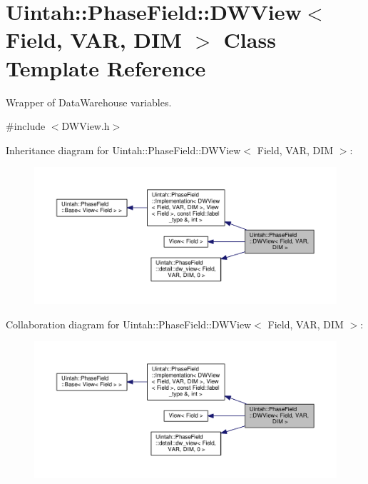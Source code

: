 \hypertarget{classUintah_1_1PhaseField_1_1DWView}{}\section{Uintah\+:\+:Phase\+Field\+:\+:D\+W\+View$<$ Field, V\+AR, D\+IM $>$ Class Template Reference}
\label{classUintah_1_1PhaseField_1_1DWView}


Wrapper of Data\+Warehouse variables.  




{\ttfamily \#include $<$D\+W\+View.\+h$>$}



Inheritance diagram for Uintah\+:\+:Phase\+Field\+:\+:D\+W\+View$<$ Field, V\+AR, D\+IM $>$\+:\nopagebreak
\begin{figure}[H]
\begin{center}
\leavevmode
\includegraphics[width=350pt]{classUintah_1_1PhaseField_1_1DWView__inherit__graph}
\end{center}
\end{figure}


Collaboration diagram for Uintah\+:\+:Phase\+Field\+:\+:D\+W\+View$<$ Field, V\+AR, D\+IM $>$\+:\nopagebreak
\begin{figure}[H]
\begin{center}
\leavevmode
\includegraphics[width=350pt]{classUintah_1_1PhaseField_1_1DWView__coll__graph}
\end{center}
\end{figure}

